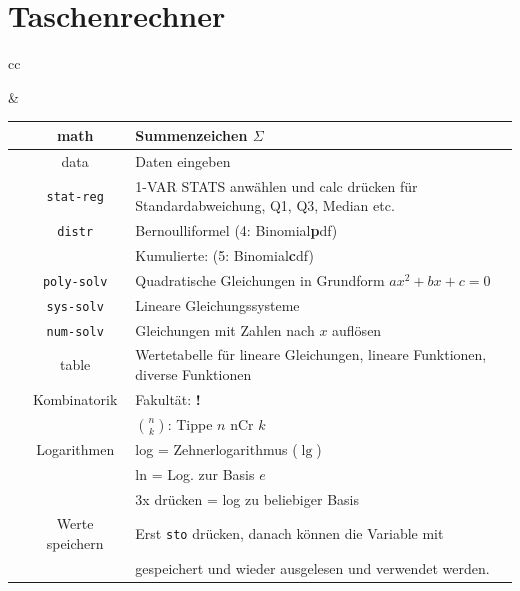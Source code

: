 \newpage


\section*{Taschenrechner}

\begin{tabular}{cc}


&

\begin{tabular}{c|c|p{80mm}}\hline
\tiprobutton{math}         &math              & Summenzeichen $\Sigma$ \\\hline
\tiprobutton{data}         &data              & Daten eingeben\\
                           &\texttt{stat-reg} & 1-VAR STATS anwählen und calc drücken für Standardabweichung, Q1, Q3, Median etc.\\
                           &\texttt{distr}    & Bernoulliformel (4: Binomial\textbf{p}df)\\
                           &                  & Kumulierte: (5: Binomial\textbf{c}df)\\\hline
\tiprobutton{cos_poly-solv}&\texttt{poly-solv}&  Quadratische Gleichungen in Grundform $ax^2+bx+c=0$\\\hline
\tiprobutton{tan_sys-solv} &\texttt{sys-solv} &  Lineare Gleichungssysteme\\\hline
\tiprobutton{sin_num-solv} &\texttt{num-solv} &  Gleichungen mit Zahlen nach $x$ auf\/lösen\\\hline
\tiprobutton{table}        & table            &  Wertetabelle für lineare Gleichungen, lineare Funktionen, diverse Funktionen\\\hline
\tiprobutton{ncrnpr}       &Kombinatorik      &  Fakultät: {\color{red}\textbf{!}}\\
                           &                  &  $n \choose k$: Tippe $n$ nCr $k$\\\hline
\tiprobutton{ln_log}       &  Logarithmen     &  log = Zehnerlogarithmus ($\lg$)\\
                           &                  &  ln  = Log. zur Basis $e$\\
                           &                  &  3x drücken = log zu beliebiger Basis\\\hline
\tiprobutton{sto_recall}   & Werte speichern  &  Erst \texttt{sto} drücken, danach können die Variable mit\\\hline
\tiprobutton{xyzabcd}      &                  & gespeichert und wieder ausgelesen und verwendet werden.
\end{tabular}
\end{tabular}


